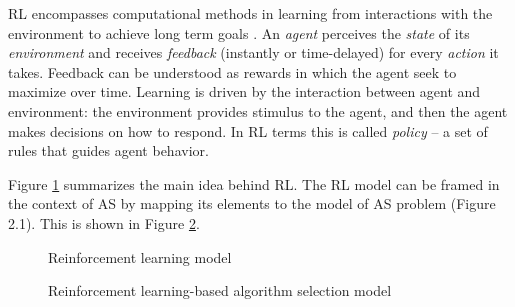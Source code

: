 RL encompasses computational methods in learning from interactions with the environment to achieve long term goals \citep{sutton1998reinforcement}. An \textit{agent} perceives the \textit{state} of its \textit{environment} and receives \textit{feedback} (instantly or time-delayed) for every \textit{action} it takes. Feedback can be understood as rewards in which the agent seek to maximize over time. Learning is driven by the interaction between agent and environment: the environment provides stimulus to the agent, and then the agent makes decisions on how to respond. In RL terms this is called \textit{policy} – a set of rules that guides agent behavior.

Figure \ref{fig:rlmodel} summarizes the main idea behind RL. The RL model can be framed in the context of AS by mapping its elements to the model of AS problem (Figure 2.1). This is shown in Figure \ref{fig:rlasmodel}.

\begin{figure}[H]
	\centering
	\caption{Reinforcement learning model}
	\label{fig:rlmodel}
\end{figure}

\begin{figure}[H]
	\centering
	\caption{Reinforcement learning-based algorithm selection model}
	\label{fig:rlasmodel}
\end{figure}


